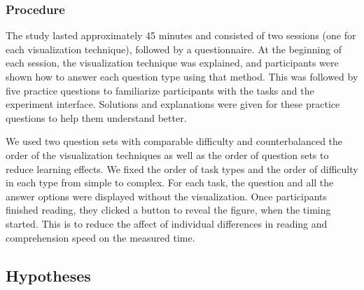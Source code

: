 \subsubsection{Procedure} The study lasted approximately 45 minutes and consisted of two sessions (one for each visualization technique), followed by a questionnaire. At the beginning of each session, the visualization technique was explained, and participants were shown how to answer each question type using that method. This was followed by five practice questions to familiarize participants with the tasks and the experiment interface. Solutions and explanations were given for these practice questions to help them understand better.

We used two question sets with comparable difficulty and counterbalanced the order of the visualization techniques as well as the order of question sets to reduce learning effects. We fixed the order of task types and the order of difficulty in each type from simple to complex. For each task, the question and all the answer options were displayed without the visualization. Once participants finished reading, they clicked a button to reveal the figure, when the timing started. This is to reduce the affect of individual differences in reading and comprehension speed on the measured time.

\subsection{Hypotheses}

